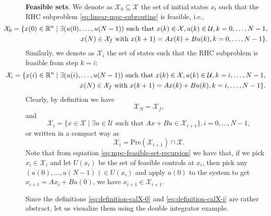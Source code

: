 \documentclass[
]{book}
\theoremstyle{definition}
\theoremstyle{definition}
\theoremstyle{definition}
\theoremstyle{definition}
\theoremstyle{remark}
\begin{document}
\textbf{Feasible sets}. We denote as \(\mathcal{X}_0 \subseteq \mathcal{X}\) the set of initial states \(x_t\) such that the RHC subproblem \eqref{eq:linear-mpc-subroutine} is feasible, i.e.,
\begin{equation}
\hspace{-14mm}
\begin{split}
\mathcal{X}_0 = \{ x(0) \in \mathbb{R}^n \mid \exists (u(0),\dots,u(N-1)) \text{ such that } x(k) \in \mathcal{X},u(k) \in \mathcal{U},k=0,\dots,N-1, \\ x(N) \in \mathcal{X}_f \text{ with } x(k+1) = A x(k) + B u(k), k=0,\dots,N-1 \}.
\end{split}
\label{eq:definition-calX-0}
\end{equation}
Similarly, we denote as \(\mathcal{X}_i\) the set of states such that the RHC subproblem is feasible from step \(k=i\):
\begin{equation}
\hspace{-14mm}
\begin{split}
\mathcal{X}_i = \{ x(i) \in \mathbb{R}^n \mid \exists (u(i),\dots,u(N-1)) \text{ such that } x(k) \in \mathcal{X}, u(k) \in \mathcal{U}, k=i,\dots,N-1, \\ x(N) \in \mathcal{X}_f \text{ with } x(k+1) = A x(k) + B u(k), k=i,\dots,N-1 \}.
\end{split}
\label{eq:definition-calX-i}
\end{equation}
Clearly, by definition we have
\[
\mathcal{X}_N = \mathcal{X}_f,
\]
and
\[
\mathcal{X}_i = \{ x \in \mathcal{X} \mid \exists u \in \mathcal{U} \text{ such that } A x + Bu \in \mathcal{X}_{i+1} \},i=0,\dots,N-1,
\]
or written in a compact way as
\begin{equation}
\mathcal{X}_i = \text{Pre}(\mathcal{X}_{i+1}) \cap \mathcal{X}.
\label{eq:mpc-feasible-set-recursion}
\end{equation}
Note that from equation \eqref{eq:mpc-feasible-set-recursion} we have that, if we pick \(x_i \in \mathcal{X}_i\) and let \(U(x_i)\) be the set of feasible controls at \(x_i\), then pick any \((u(0),\dots,u(N-1)) \in U(x_i)\) and apply \(u(0)\) to the system to get \(x_{i+1} = A x_i + B u(0)\), we have \(x_{i+1} \in \mathcal{X}_{i+1}\).

Since the definitions \eqref{eq:definition-calX-0} and \eqref{eq:definition-calX-i} are rather abstract, let us visualize them using the double integrator example.
\end{document}
